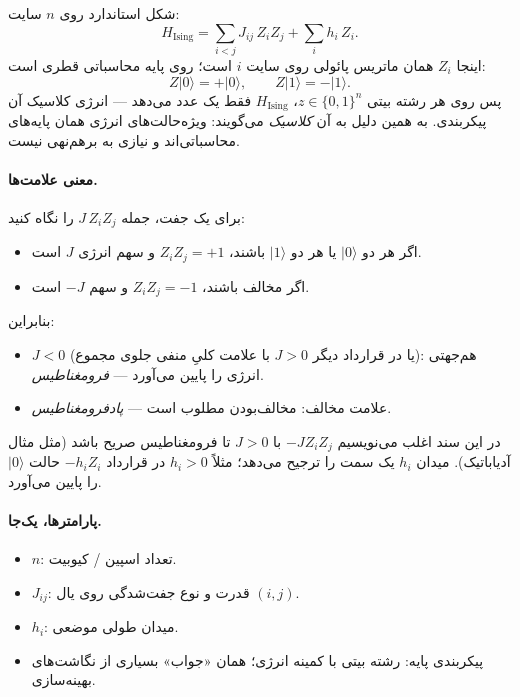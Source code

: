 شکل استاندارد روی $n$ سایت:
\begin{equation}
	\label{eq:ising-classical}
	H_{\mathrm{Ising}}
	=
	\sum_{i<j} J_{ij}\, Z_i Z_j
	+
	\sum_{i} h_i\, Z_i.
\end{equation}
اینجا $Z_i$ همان ماتریس پائولی روی سایت $i$ است؛ روی پایه محاسباتی قطری است:
\begin{equation}
	Z\lvert0\rangle=+\lvert0\rangle,
	\qquad
	Z\lvert1\rangle=-\lvert1\rangle.
\end{equation}
پس روی هر رشته بیتی $z\in\{0,1\}^n$، $H_{\mathrm{Ising}}$ فقط یک عدد می‌دهد --- انرژی کلاسیک آن پیکربندی. به همین دلیل به آن \emph{ کلاسیک} می‌گویند: ویژه‌حالت‌های انرژی همان پایه‌های محاسباتی‌اند و نیازی به برهم‌نهی نیست.

\paragraph{معنی علامت‌ها.}
برای یک جفت، جمله $J\,Z_i Z_j$ را نگاه کنید:
\begin{itemize}
	\item اگر هر دو $\lvert0\rangle$ یا هر دو $\lvert1\rangle$ باشند، $Z_iZ_j=+1$ و سهم انرژی $J$ است.
	\item اگر مخالف باشند، $Z_iZ_j=-1$ و سهم $-J$ است.
\end{itemize}
بنابراین:
\begin{itemize}
	\item $J<0$ (یا در قرارداد دیگر $J>0$ با علامت کلیِ منفی جلوی مجموع): هم‌جهتی انرژی را پایین می‌آورد --- \emph{فرومغناطیس}.
	\item علامت مخالف: مخالف‌بودن مطلوب است --- \emph{پادفرومغناطیس}.
\end{itemize}
در این سند اغلب می‌نویسیم $-J Z_i Z_j$ با $J>0$ تا فرومغناطیس صریح باشد (مثل مثال آدیاباتیک). میدان $h_i$ یک سمت را ترجیح می‌دهد؛ مثلاً $h_i>0$ در قرارداد $-h_i Z_i$ حالت $\lvert0\rangle$ را پایین می‌آورد.

\paragraph{پارامترها، یک‌جا.}
\begin{itemize}
	\item $n$: تعداد اسپین / کیوبیت.
	\item $J_{ij}$: قدرت و نوع جفت‌شدگی روی یال $(i,j)$.
	\item $h_i$: میدان طولی موضعی.
	\item پیکربندی پایه: رشته بیتی با کمینه انرژی؛ همان «جواب» بسیاری از نگاشت‌های بهینه‌سازی.
\end{itemize}

